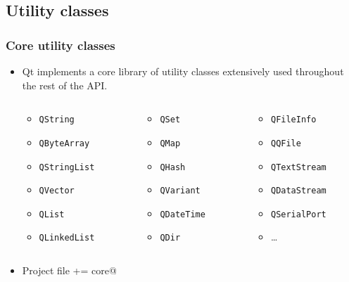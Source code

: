 \subsection{Utility classes}

\begin{frame}[fragile]
  \frametitle{Core utility classes}
  \begin{itemize}
  \item Qt implements a core library of utility classes extensively used
    throughout the rest of the API.
  \begin{columns}
    \footnotesize
    \begin{column}{0.28\textwidth}
    \begin{itemize}
      \item \texttt{QString}
      \item \texttt{QByteArray}
      \item \texttt{QStringList}
      \item \texttt{QVector}
      \item \texttt{QList}
      \item \texttt{QLinkedList}
    \end{itemize}
    \end{column}
    \begin{column}{0.31\textheight}
    \begin{itemize}
      \item \texttt{QSet}
      \item \texttt{QMap}
      \item \texttt{QHash}
      \item \texttt{QVariant}
      \item \texttt{QDateTime}
      \item \texttt{QDir}
    \end{itemize}
    \end{column}
    \begin{column}{0.31\textheight}
    \begin{itemize}
      \item \texttt{QFileInfo}
      \item \texttt{QQFile}
      \item \texttt{QTextStream}
      \item \texttt{QDataStream}
      \item \texttt{QSerialPort}
      \item \ldots
    \end{itemize}
    \end{column}
  \end{columns}

  \item Project file \verb@QT += core@
  \end{itemize}
\end{frame}

